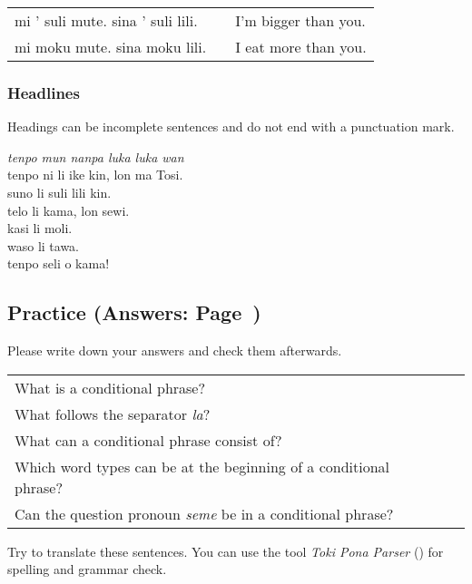 \begin{supertabular}{p{5,5cm}|ll}
mi ' suli mute. sina ' suli lili. && I'm bigger than you. \\
mi moku mute. sina moku lili. && I eat more than you. \\
\end{supertabular} 

%
%
\subsubsection*{Headlines} 
%
%
Headings can be incomplete sentences and do not end with a punctuation mark.

\textit{tenpo mun nanpa luka luka wan} \\
tenpo ni li ike kin, lon ma Tosi. \\
suno li suli lili kin. \\ 
telo li kama, lon sewi. \\
kasi li moli. \\
waso li tawa. \\
tenpo seli o kama! 

%
%
%
\newpage
%
\subsection*{Practice (Answers: Page~\pageref{'la'})}
%
Please write down your answers and check them afterwards. 

\begin{supertabular}{p{5,5cm}|ll}
What is a conditional phrase? &&  \\  %
What follows the separator \textit{la}? &&  \\  %
What can a conditional phrase consist of?  &&  \\  %
Which word types can be at the beginning of a conditional phrase? &&  \\  %
Can the question pronoun \textit{seme} be in a conditional phrase? &&   \\  %
\end{supertabular}

Try to translate these sentences. 
You can use the tool \textit{Toki Pona Parser} (\cite{www:rowa:02}) for spelling and grammar check. 


